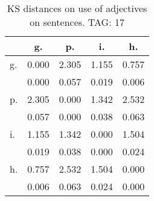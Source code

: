 \begin{table}[h!]
\begin{center}
\begin{tabular}{| l | c | c | c | c |}\hline
 & g. & p. & i. & h. \\\hline
g. & 0.000  & 2.305  & 1.155  & 0.757 \\\hline
 & 0.000  & 0.057  & 0.019  & 0.006 \\\hline
p. & 2.305  & 0.000  & 1.342  & 2.532 \\\hline
 & 0.057  & 0.000  & 0.038  & 0.063 \\\hline
i. & 1.155  & 1.342  & 0.000  & 1.504 \\\hline
 & 0.019  & 0.038  & 0.000  & 0.024 \\\hline
h. & 0.757  & 2.532  & 1.504  & 0.000 \\\hline
 & 0.006  & 0.063  & 0.024  & 0.000 \\\hline
\end{tabular}
\caption{KS distances on use of adjectives on sentences. TAG: 17}
\end{center}
\end{table}